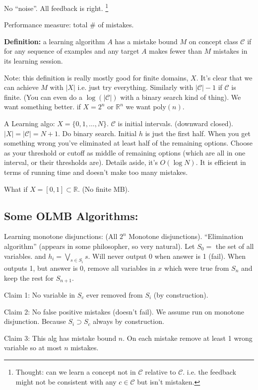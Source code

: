 \documentclass[10pt]{article}
\newcommand{\R}{\mathbb{R}}
\newcommand{\mcC}{\mathcal{C}}
\begin{document}
No ``noise''. All feedback is right. 
\footnote{Thought: can we learn a concept not in \(\mcC\) relative to \(\mcC\). i.e. the feedback might not be consistent with any \(c \in \mcC\) but isn't mistaken.}

Performance measure: total \(\#\) of mistakes. 

\textbf{Definition:} a learning algorithm \(A\) has a mistake bound \(M\) on concept class \(\mcC\) if for any sequence of examples and any target \(A\) makes fewer than \(M\) mistakes in its learning session. 

Note: this definition is really mostly good for finite domains, \(X\).
It's clear that we can achieve \(M\) with \(|X|\) i.e. just try everything. 
Similarly with \(|\mcC| - 1\) if \(\mcC\) is finite. (You can even do a \(\log(|\mcC|)\) with a binary search kind of thing). 
We want something better. if \(X = 2^n\) or \(\R^n\) we want poly\((n)\). 

A Learning algo: \(X = \{0, 1, \ldots, N\}\). \(\mcC\) is initial intervals. (downward closed). 
\(|X| = |\mcC| = N + 1\). Do binary search. Initial \(h\) is just the first half. When you get something wrong you've eliminated at least half of the remaining options. Choose as your threshold or cutoff as middle of remaining options (which are all in one interval, or their thresholds are). Details aside, it's \(O(\log N)\). It is efficient in terms of running time and doesn't make too many mistakes. 

What if \(X = [0, 1] \subset \R\). (No finite MB). 

\subsection{Some OLMB Algorithms:}
Learning monotone disjunctions: (All \(2^n\) Monotone disjunctions). 
``Elimination algorithm'' (appears in some philosopher, so very natural). 
Let \(S_0 = \) the set of all variables. and \(h_i = \bigvee_{s \in S_i}s\). Will never output 0 when answer is 1 (fail). 
When outputs 1, but answer is 0, remove all variables in \(x\) which were true from \(S_n\) and keep the rest for \(S_{n+1}\).

Claim 1: No variable in \(S_c\) ever removed from \(S_i\) (by construction).

Claim 2: No false positive mistakes (doesn't fail). We assume run on monotone disjunction. Because \(S_i \supset S_c\) always by construction. 

Claim 3: This alg has mistake bound \(n\). On each mistake remove at least 1 wrong variable so at most \(n\) mistakes. 
\end{document}
